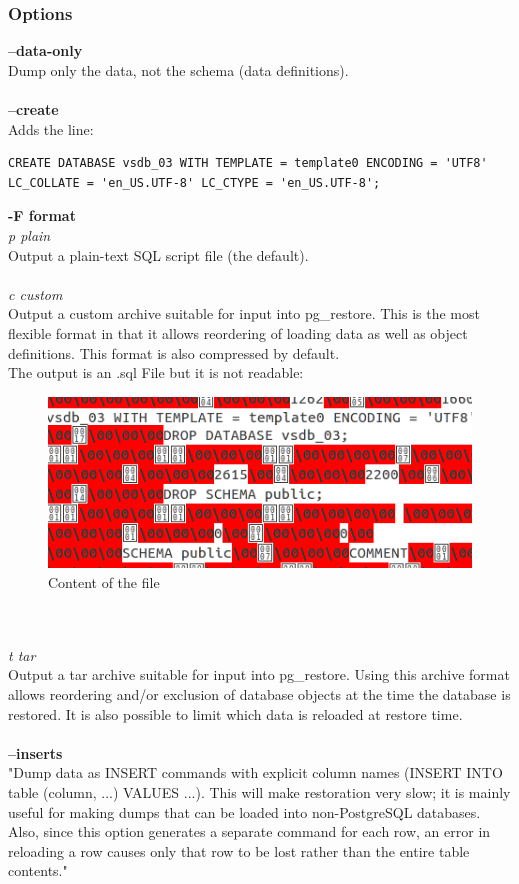 \documentclass[10pt]{article}
\begin{document}
\subsubsection{Options}
\textbf{--data-only}\\
Dump only the data, not the schema (data definitions).
\\ \\
\textbf{--create}\\
Adds the line:
\begin{lstlisting}    
CREATE DATABASE vsdb_03 WITH TEMPLATE = template0 ENCODING = 'UTF8' LC_COLLATE = 'en_US.UTF-8' LC_CTYPE = 'en_US.UTF-8';
\end{lstlisting}    
\textbf{-F format}\\
\textit{p plain }\\
Output a plain-text SQL script file (the default).
\\ \\
\textit{c custom} \\
Output a custom archive suitable for input into pg\_restore. This is the most flexible format in that it allows reordering of loading data as well as object definitions. This format is also compressed by default. \\
The output is an .sql File but it is not readable:
\begin{figure}[!h]
	\begin{center}
		\includegraphics[width=0.5\linewidth]{pictures/content}
		\caption{Content of the file}
		\label{content}
	\end{center}
\end{figure} 
\\ \\
\textit{t tar} \\
Output a tar archive suitable for input into pg\_restore. Using this archive format allows reordering and/or exclusion of database objects at the time the database is restored. It is also possible to limit which data is reloaded at restore time.
\\ \\
\textbf{--inserts}\\
"Dump data as INSERT commands with explicit column names (INSERT INTO table (column, ...) VALUES ...). This will make restoration very slow; it is mainly useful for making dumps that can be loaded into non-PostgreSQL databases. Also, since this option generates a separate command for each row, an error in reloading a row causes only that row to be lost rather than the entire table contents." \cite{pgdumpdoc} \\
\end{document}
